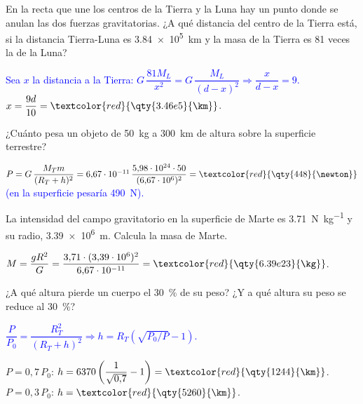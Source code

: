 \begin{exercise}
    En la recta que une los centros de la Tierra y la Luna hay un punto donde se anulan las dos fuerzas gravitatorias. ¿A
    qué distancia del centro de la Tierra está, si la distancia Tierra-Luna es \qty{3.84e5}{\km} y la masa de la Tierra es 81
    veces la de la Luna?
    \begin{solu}
        \textcolor{blue}{Sea \(x\) la distancia a la Tierra: \(G\,\dfrac{81 M_L}{x^2} = G\,\dfrac{M_L}{(d - x)^2} \Rightarrow \dfrac{x}{d - x} = 9\).}
        \(x = \dfrac{9d}{10} = \textcolor{red}{\qty{3.46e5}{\km}}\).
    \end{solu}
\end{exercise}

\begin{exercise}
    ¿Cuánto pesa un objeto de \qty{50}{\kg} a \qty{300}{\km} de altura sobre la superficie terrestre?
    \begin{solu}
        \(P = G\,\dfrac{M_T m}{(R_T + h)^2} = 6{,}67\cdot 10^{-11}\,\dfrac{5{,}98\cdot 10^{24}\cdot 50}{(6{,}67\cdot 10^6)^2} = \textcolor{red}{\qty{448}{\newton}}\)
        \textcolor{blue}{(en la superficie pesaría \qty{490}{\newton}).}
    \end{solu}
\end{exercise}

\begin{exercise}
    La intensidad del campo gravitatorio en la superficie de Marte es \qty{3.71}{\newton\per\kg} y su radio, \qty{3.39e6}{\m}.
    Calcula la masa de Marte.
    \begin{solu}
        \(M = \dfrac{g R^2}{G} = \dfrac{3{,}71\cdot(3{,}39\cdot 10^6)^2}{6{,}67\cdot 10^{-11}} = \textcolor{red}{\qty{6.39e23}{\kg}}\).
    \end{solu}
\end{exercise}

\begin{exercise}
    ¿A qué altura pierde un cuerpo el \qty{30}{\percent} de su peso? ¿Y a qué altura su peso se reduce al \qty{30}{\percent}?
    \begin{solu}
        \textcolor{blue}{\(\dfrac{P}{P_0} = \dfrac{R_T^2}{(R_T + h)^2} \Rightarrow h = R_T\left(\sqrt{P_0/P} - 1\right)\).}

        \(P = 0{,}7\,P_0\): \(h = 6370\left(\dfrac{1}{\sqrt{0{,}7}} - 1\right) = \textcolor{red}{\qty{1244}{\km}}\).
        \(P = 0{,}3\,P_0\): \(h = \textcolor{red}{\qty{5260}{\km}}\).
    \end{solu}
\end{exercise}

